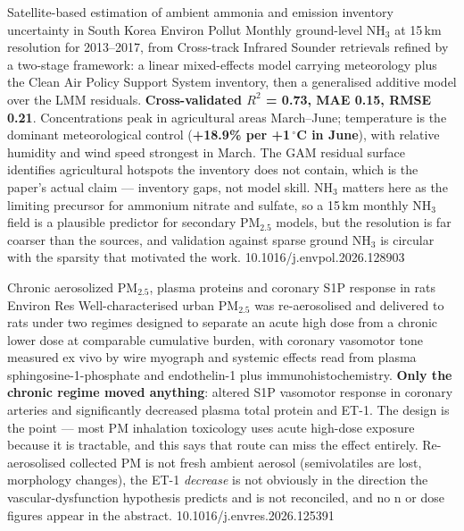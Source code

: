 \documentclass[10pt]{article}
\begin{document}
{Satellite-based estimation of ambient ammonia and emission inventory uncertainty in South Korea}
{Environ Pollut}
{Monthly ground-level NH$_3$ at 15\,km resolution for 2013--2017, from Cross-track Infrared
Sounder retrievals refined by a two-stage framework: a linear mixed-effects model carrying
meteorology plus the Clean Air Policy Support System inventory, then a generalised additive
model over the LMM residuals. \textbf{Cross-validated $R^2$ = 0.73, MAE 0.15, RMSE 0.21}.
Concentrations peak in agricultural areas March--June; temperature is the dominant
meteorological control (\textbf{+18.9\% per +1\,$^{\circ}$C in June}), with relative
humidity and wind speed strongest in March. The GAM residual surface identifies
agricultural hotspots the inventory does not contain, which is the paper's actual claim ---
inventory gaps, not model skill. NH$_3$ matters here as the limiting precursor for ammonium
nitrate and sulfate, so a 15\,km monthly NH$_3$ field is a plausible predictor for
secondary PM$_{2.5}$ models, but the resolution is far coarser than the sources, and
validation against sparse ground NH$_3$ is circular with the sparsity that motivated the
work.}
{10.1016/j.envpol.2026.128903}


{Chronic aerosolized PM$_{2.5}$, plasma proteins and coronary S1P response in rats}
{Environ Res}
{Well-characterised urban PM$_{2.5}$ was re-aerosolised and delivered to rats under two
regimes designed to separate an acute high dose from a chronic lower dose at comparable
cumulative burden, with coronary vasomotor tone measured ex vivo by wire myograph and
systemic effects read from plasma sphingosine-1-phosphate and endothelin-1 plus
immunohistochemistry. \textbf{Only the chronic regime moved anything}: altered S1P vasomotor
response in coronary arteries and significantly decreased plasma total protein and ET-1.
The design is the point --- most PM inhalation toxicology uses acute high-dose exposure
because it is tractable, and this says that route can miss the effect entirely. Re-aerosolised
collected PM is not fresh ambient aerosol (semivolatiles are lost, morphology changes), the
ET-1 \emph{decrease} is not obviously in the direction the vascular-dysfunction hypothesis
predicts and is not reconciled, and no n or dose figures appear in the abstract.}
{10.1016/j.envres.2026.125391}
\end{document}
